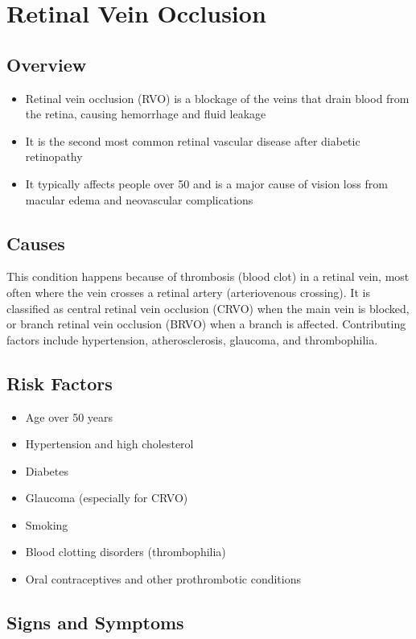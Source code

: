 \chapter{Retinal Vein Occlusion}
\label{sec:Retinal Vein Occlusion}

\section{Overview}
\begin{itemize}[noitemsep]
  \item Retinal vein occlusion (RVO) is a blockage of the veins that drain blood from the retina, causing hemorrhage and fluid leakage
  \item It is the second most common retinal vascular disease after diabetic retinopathy
  \item It typically affects people over 50 and is a major cause of vision loss from macular edema and neovascular complications
\end{itemize}
\section{Causes}
This condition happens because of thrombosis (blood clot) in a retinal vein, most often where the vein crosses a retinal artery (arteriovenous crossing). It is classified as central retinal vein occlusion (CRVO) when the main vein is blocked, or branch retinal vein occlusion (BRVO) when a branch is affected. Contributing factors include hypertension, atherosclerosis, glaucoma, and thrombophilia.
\section{Risk Factors}
\begin{itemize}[noitemsep]
  \item Age over 50 years
  \item Hypertension and high cholesterol
  \item Diabetes
  \item Glaucoma (especially for CRVO)
  \item Smoking
  \item Blood clotting disorders (thrombophilia)
  \item Oral contraceptives and other prothrombotic conditions
\end{itemize}
\section{Signs and Symptoms}
